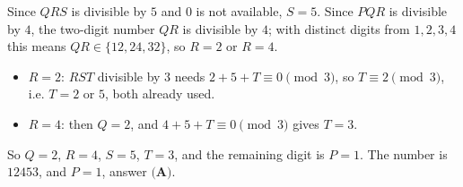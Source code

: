 Since $QRS$ is divisible by $5$ and $0$ is not available, $S=5$. Since $PQR$ is divisible by $4$, the two-digit number $QR$ is divisible by $4$; with distinct digits from $1,2,3,4$ this means $QR\in\{12,24,32\}$, so $R=2$ or $R=4$.
\begin{itemize}
\item $R=2$: $RST$ divisible by $3$ needs $2+5+T\equiv0\pmod3$, so $T\equiv2\pmod 3$, i.e. $T=2$ or $5$, both already used.
\item $R=4$: then $Q=2$, and $4+5+T\equiv0\pmod3$ gives $T=3$.
\end{itemize}
So $Q=2$, $R=4$, $S=5$, $T=3$, and the remaining digit is $P=1$. The number is $12453$, and $P=\boxed{1}$, answer $\textbf{(A)}$.
